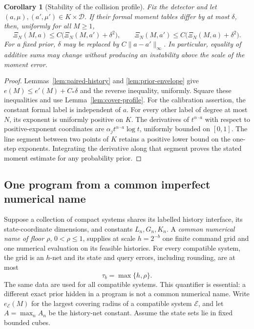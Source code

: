 \documentclass[11pt]{amsart}
\newtheorem{corollary}[theorem]{Corollary}
\theoremstyle{definition}\newtheorem{definition}[theorem]{Definition}
\theoremstyle{remark}\newtheorem{remark}[theorem]{Remark}
\begin{document}
\begin{corollary}[Stability of the collision profile]
\label{cor:profile-stability}
Fix the detector and let $(a,\mu),(a',\mu')\in K\times\mathcal D$.
If their formal moment tables differ by at most $\delta$, then,
uniformly for all $M\ge1$,
\begin{equation}\label{eq:xi-stability}
 \Xi_N(M,a)\le C\bigl(\Xi_N(M,a')+\delta^2\bigr),\qquad
 \Xi_N(M,a')\le C\bigl(\Xi_N(M,a)+\delta^2\bigr).
\end{equation}
For a fixed prior, $\delta$ may be replaced by $C\|a-a'\|_\infty$.
In particular, equality of additive sums may change without producing
an instability above the scale of the moment error.
\end{corollary}
\begin{proof}
Lemmas~\ref{lem:paired-history} and \ref{lem:prior-envelope} give
$e(M)\le e'(M)+C_*\delta$ and the reverse inequality, uniformly.
Square these inequalities and use Lemma~\ref{lem:cover-profile}.
For the calibration assertion, the constant formal label is independent
of $a$. For every other label of degree at most $N$, its exponent is
uniformly positive on $K$. The derivatives of $t^{\alpha\cdot a}$
with respect to positive-exponent coordinates are
$\alpha_jt^{\alpha\cdot a}\log t$, uniformly bounded on $[0,1]$.
The line segment between two points of $K$ retains a positive lower
bound on the one-step exponents. Integrating the derivative along that
segment proves the stated moment estimate for any probability prior.
\end{proof}

\subsection{One program from a common imperfect numerical name}
Suppose a collection of compact systems shares its labelled history
interface, its state-coordinate dimensions, and constants $L_n,G_n,K_n$.
A \emph{common numerical name of floor $\rho$}, $0<\rho\le1$, supplies
at scale $h=2^{-b}$ one finite command grid and one numerical evaluation
on its feasible histories. For every compatible system, the grid is an
$h$-net and its state and query errors, including rounding, are at most
\[
 \tau_b=\max\{h,\rho\}.
\]
The same data are used for all compatible systems. This quantifier is
essential: a different exact prior hidden in a program is not a common
numerical name. Write $e_{\mathcal E}(M)$ for the largest covering radius
of a compatible system $\mathcal E$, and let $A=\max_n A_n$ be the
history-net constant. Assume the state sets lie in fixed bounded cubes.
\end{document}
